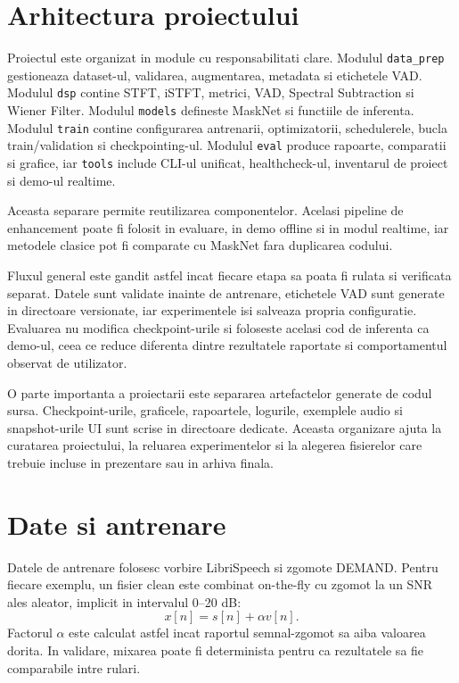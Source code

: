 \documentclass[12pt,a4paper]{report}
\begin{document}
\section{Arhitectura proiectului}

Proiectul este organizat in module cu responsabilitati clare. Modulul
\texttt{data\_prep} gestioneaza dataset-ul, validarea, augmentarea, metadata si
etichetele VAD. Modulul \texttt{dsp} contine STFT, iSTFT, metrici, VAD,
Spectral Subtraction si Wiener Filter. Modulul \texttt{models} defineste
MaskNet si functiile de inferenta. Modulul \texttt{train} contine configurarea
antrenarii, optimizatorii, schedulerele, bucla train/validation si
checkpointing-ul. Modulul \texttt{eval} produce rapoarte, comparatii si
grafice, iar \texttt{tools} include CLI-ul unificat, healthcheck-ul, inventarul
de proiect si demo-ul realtime.

Aceasta separare permite reutilizarea componentelor. Acelasi pipeline de
enhancement poate fi folosit in evaluare, in demo offline si in modul realtime,
iar metodele clasice pot fi comparate cu MaskNet fara duplicarea codului.

Fluxul general este gandit astfel incat fiecare etapa sa poata fi rulata si
verificata separat. Datele sunt validate inainte de antrenare, etichetele VAD
sunt generate in directoare versionate, iar experimentele isi salveaza propria
configuratie. Evaluarea nu modifica checkpoint-urile si foloseste acelasi cod
de inferenta ca demo-ul, ceea ce reduce diferenta dintre rezultatele raportate
si comportamentul observat de utilizator.

O parte importanta a proiectarii este separarea artefactelor generate de codul
sursa. Checkpoint-urile, graficele, rapoartele, logurile, exemplele audio si
snapshot-urile UI sunt scrise in directoare dedicate. Aceasta organizare ajuta
la curatarea proiectului, la reluarea experimentelor si la alegerea fisierelor
care trebuie incluse in prezentare sau in arhiva finala.

\section{Date si antrenare}

Datele de antrenare folosesc vorbire LibriSpeech si zgomote DEMAND. Pentru
fiecare exemplu, un fisier clean este combinat on-the-fly cu zgomot la un SNR
ales aleator, implicit in intervalul 0--20 dB:
\[
x[n] = s[n] + \alpha v[n].
\]
Factorul \(\alpha\) este calculat astfel incat raportul semnal-zgomot sa aiba
valoarea dorita. In validare, mixarea poate fi determinista pentru ca
rezultatele sa fie comparabile intre rulari.
\end{document}
